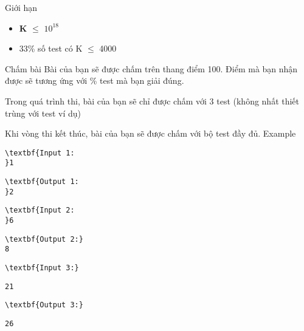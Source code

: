 Giới hạn
\begin{itemize}
	\item \textbf{K }  $\le$  $10^{18}$
	\item 33\% số test có K  $\le$  4000
\end{itemize}
Chấm bài
Bài của bạn sẽ được chấm trên thang điểm 100. Điểm mà bạn nhận được sẽ tương ứng với \% test mà bạn giải đúng.

Trong quá trình thi, bài của bạn sẽ chỉ được chấm với 3 test (không nhất thiết trùng với test ví dụ)

Khi vòng thi kết thúc, bài của bạn sẽ được chấm với bộ test đầy đủ.
Example
\begin{verbatim}
\textbf{Input 1:
}1\end{verbatim}
\begin{verbatim}
\textbf{Output 1:
}2
\end{verbatim}
\begin{verbatim}
\textbf{Input 2:
}6 \end{verbatim}
\begin{verbatim}
\textbf{Output 2:}
8
\end{verbatim}
\begin{verbatim}
\textbf{Input 3:}\end{verbatim}
\begin{verbatim}
21 \end{verbatim}
\begin{verbatim}
\textbf{Output 3:}\end{verbatim}
\begin{verbatim}
26
\end{verbatim}